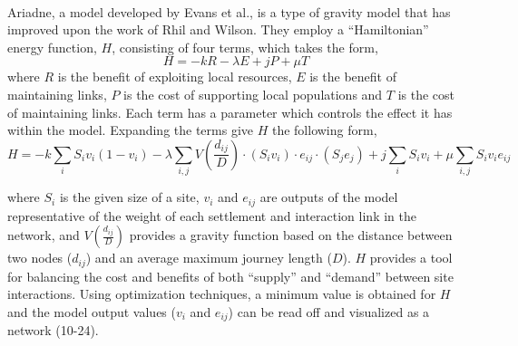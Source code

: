 \documentclass[12pt,a4paper]{thesis}
\begin{document}
\paragraph{}
Ariadne, a model developed by Evans et al., is a type of gravity model that has improved upon the work of Rhil and Wilson. They employ a ``Hamiltonian'' energy function, $H$, consisting of four terms, which takes the form,
			\begin{equation}
			H = -kR - \lambda E + jP + \mu T
			\label{eq:simpleHam}
			\end{equation}  
where $R$ is the benefit of exploiting local resources, $E$ is the benefit of maintaining links, $P$ is the cost of supporting local populations and $T$ is the cost of maintaining links. Each term has a parameter which controls the effect it has within the model. Expanding the terms give $H$ the following form,
			\begin{equation}
			H = -k\sum_{i}S_{i}v_{i}(1-v_{i}) - \lambda\sum_{i,j}V(\frac{d_{ij}}{D})\cdot(S_{i}v_{i})\cdot e_{ij}\cdot (S_{j}e_{j}) + j\sum_{i}S_{i}v_{i} + \mu\sum_{i,j}S_{i}v_{i}e_{ij}
			\label{eq:expandedHam}
			\end{equation}

where $S_{i}$ is the given size of a site, $v_{i}$ and $e_{ij}$ are outputs of the model representative of the weight of each settlement and interaction link in the network, and $V(\frac{d_{ij}}{D})$ provides a gravity function based on the distance between two nodes ($d_{ij}$) and an average maximum journey length ($D$). $H$ provides a tool for balancing the cost and benefits of both ``supply'' and ``demand'' between site interactions. Using optimization techniques, a minimum value is obtained for $H$ and the model output values ($v_{i}$ and $e_{ij}$) can be read off and visualized as a network (10-24). 
\end{document}
